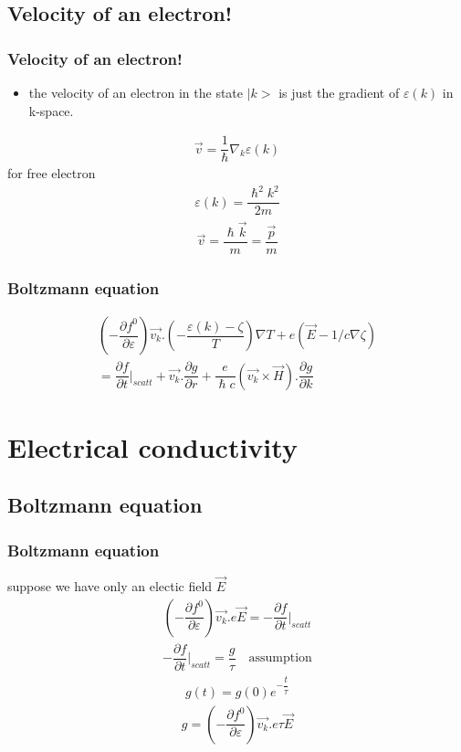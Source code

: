 \documentclass{beamer}
\begin{document}
\subsection{Velocity of an electron!}
\begin{frame}
\frametitle{Velocity of an electron!}
\begin{itemize}
\pause
\item the velocity of an electron in the state $|k>$ is just the gradient of $\varepsilon (k)$ in k-space.
\end{itemize}
\pause
\begin{align*}
\vec{v} = \dfrac{1}{\hslash} \nabla _k \varepsilon (k)
\end{align*}
\pause
for free electron 
\begin{align*}
\varepsilon (k) = \dfrac{\hslash^2 k^2}{2m}
\end{align*}
\begin{align*}
\vec{v} = \dfrac{\hslash \vec{k}}{m} = \dfrac{\vec{p}}{m}
\end{align*}
\end{frame}
\begin{frame}
\frametitle{Boltzmann equation}
\begin{align*}
(- \dfrac{\partial f^0}{\partial \varepsilon}) \vec{v_k} . (-\dfrac{\varepsilon (k) - \zeta}{T}) \nabla T + e (\vec{E} - 1/c \nabla \zeta) \\
= \dfrac{\partial f}{\partial t} \big| _{scatt} + \vec{v_k}.\dfrac{\partial g}{\partial r} + \dfrac{e}{\hslash c} (\vec{v_k} \times \vec{H}) . \dfrac{\partial g}{\partial k}
\end{align*}
\end{frame}
\section{Electrical conductivity}
\subsection{Boltzmann equation}
\begin{frame}
\frametitle{Boltzmann equation}
suppose we have only an electic field $\vec{E}$
\pause
\begin{align*}
(- \dfrac{\partial f^0}{\partial \varepsilon}) \vec{v_k} . e \vec{E} = -\dfrac{\partial f}{\partial t} \big| _{scatt}
\end{align*}
\pause
\begin{align*}
-\dfrac{\partial f}{\partial t} \big| _{scatt} = \dfrac{g}{\tau} \quad  \text{assumption}
\end{align*}
\pause
\begin{align*}
g(t) = g(0)e^{- \dfrac{t}{\tau}}
\end{align*}
\pause
\begin{align*}
\boxed{g = (- \dfrac{\partial f^0}{\partial \varepsilon}) \vec{v_k} . e \tau \vec{E}} 
\end{align*}
\end{frame}
\end{document}
